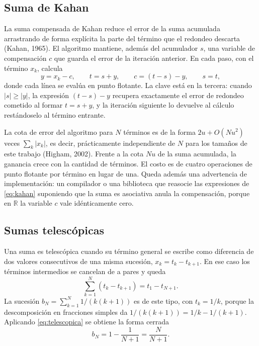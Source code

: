 \subsection{Suma de Kahan}
\label{subsec:kahan}

La suma compensada de Kahan reduce el error de la suma acumulada arrastrando de forma explícita la
parte del término que el redondeo descarta (Kahan, 1965). El algoritmo mantiene, además del
acumulador $s$, una variable de compensación $c$ que guarda el error de la iteración anterior. En
cada paso, con el término $x_k$, calcula
\begin{equation}
  y = x_k - c, \qquad
  t = s + y, \qquad
  c = (t - s) - y, \qquad
  s = t ,
  \label{eq:kahan}
\end{equation}
donde cada línea se evalúa en punto flotante. La clave está en la tercera: cuando $|s| \ge |y|$, la
expresión $(t - s) - y$ recupera exactamente el error de redondeo cometido al formar $t = s + y$, y
la iteración siguiente lo devuelve al cálculo restándoselo al término entrante.

La cota de error del algoritmo para $N$ términos es de la forma $2u + O(Nu^{2})$ veces
$\sum_k |x_k|$, es decir, prácticamente independiente de $N$ para los tamaños de este trabajo
(Higham, 2002). Frente a la cota $Nu$ de la suma acumulada, la ganancia crece con la cantidad de
términos. El costo es de cuatro operaciones de punto flotante por término en lugar de una. Queda
además una advertencia de implementación: un compilador o una biblioteca que reasocie las
expresiones de \eqref{eq:kahan} suponiendo que la suma es asociativa anula la compensación, porque
en $\mathbb{R}$ la variable $c$ vale idénticamente cero.

\subsection{Sumas telescópicas}
\label{subsec:telescopicas}

Una suma es telescópica cuando su término general se escribe como diferencia de dos valores
consecutivos de una misma sucesión, $x_k = t_k - t_{k+1}$. En ese caso los términos intermedios se
cancelan de a pares y queda
\begin{equation}
  \sum_{k=1}^{N} (t_k - t_{k+1}) = t_1 - t_{N+1} .
  \label{eq:telescopica}
\end{equation}
La sucesión $b_N = \sum_{k=1}^{N} 1/(k(k+1))$ es de este tipo, con $t_k = 1/k$, porque la
descomposición en fracciones simples da $1/(k(k+1)) = 1/k - 1/(k+1)$. Aplicando
\eqref{eq:telescopica} se obtiene la forma cerrada
\begin{equation}
  b_N = 1 - \frac{1}{N+1} = \frac{N}{N+1} .
  \label{eq:forma-cerrada}
\end{equation}

